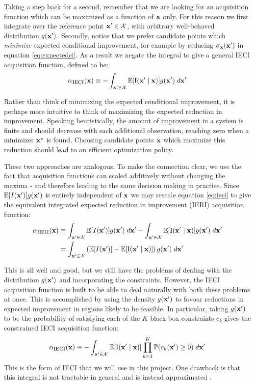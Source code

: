 Taking a step back for a second, remember that we are looking for an acquisition function which can be maximized as a function of $\mathbf{x}$ only. For this reason we first integrate over the reference point $\mathbf{x}' \in \mathcal{X}$, with arbitrary well-behaved distribution $g(\mathbf{x}')$. Secondly, notice that we prefer candidate points which \textit{minimize} expected conditional improvement, for example by reducing $\sigma_{\mathbf{x}}(\mathbf{x}')$ in equation \ref{eq:expectedci}. As a result we negate the integral to give a general IECI acquisition function, defined to be:
%
\begin{equation}
\alpha_{\mathrm{IECI}}(\mathbf{x}) \equiv - \int_{\mathbf{x}' \in \mathcal{X}} \mathbb{E}[\mathrm{I}(\mathbf{x}' \mid \mathbf{x})] g(\mathbf{x}') \; d\mathbf{x}' \label{eq:ieci}
\end{equation}

Rather than think of minimizing the expected conditional improvement, it is perhaps more intuitive to think of maximizing the expected reduction in improvement. Speaking heuristically, the amount of improvement in a system is finite and should decrease with each additional observation, reaching zero when a minimizer $\mathbf{x}^\star$ is found. Choosing candidate points $\mathbf{x}$ which maximize this reduction should lead to an efficient optimization policy. 

These two approaches are analogous. To make the connection clear, we use the fact that acquisition functions can scaled additively without changing the maxima - and therefore leading to the same decision making in practise. Since $\mathbb{E}[I(\mathbf{x}')] g(\mathbf{x}')$ is entirely independent of $\mathbf{x}$ we may rescale equation \ref{eq:ieci} to give the equivalent integrated expected reduction in improvement (IERI) acquisition function:
%
\begin{align}
\nonumber \alpha_{\mathrm{IERI}}(\mathbf{x}) &\equiv 
\int_{\mathbf{x}' \in \mathcal{X}} \mathbb{E}[I(\mathbf{x}')] g(\mathbf{x}') \; d\mathbf{x}' - \int_{\mathbf{x}' \in \mathcal{X}} \mathbb{E}[\mathrm{I}(\mathbf{x}' \mid \mathbf{x})] g(\mathbf{x}') \; d\mathbf{x}' \\
&= \int_{\mathbf{x}' \in \mathcal{X}} \left( \mathbb{E}[I(\mathbf{x}')] - \mathbb{E}[\mathrm{I}(\mathbf{x}' \mid \mathbf{x})] \right) g(\mathbf{x}') \; d\mathbf{x}' \label{ieri}
\end{align}

This is all well and good, but we still have the problems of dealing with the distribution $g(\mathbf{x}')$ and incorporating the constraints. However, the IECI acquisition function is built to be able to deal naturally with both these problems at once. This is accomplished by using the density $g(\mathbf{x}')$ to favour reductions in expected improvement in regions likely to be feasible. In particular, taking $g(\mathbf{x}')$ to be the probability of satisfying each of the $K$ black-box constraints $c_k$ gives the constrained IECI acquisition function:
%
\begin{equation}
\alpha_{\mathrm{IECI}}(\mathbf{x}) \equiv - \int_{\mathbf{x}' \in \mathcal{X}} \mathbb{E}[\mathrm{I}(\mathbf{x}' \mid \mathbf{x})] \prod_{k=1}^{K} \mathbb{P}(c_{k}(\mathbf{x}') \geq 0) \; d\mathbf{x}' \label{cieci}
\end{equation}
%
This is the form of IECI that we will use in this project. One drawback is that this integral is not tractable in general and is instead approximated \cite{gramacy2011optimization}.
